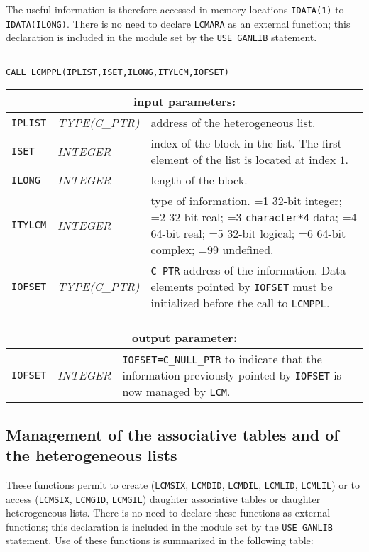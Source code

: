 The useful information is therefore accessed in memory locations {\tt IDATA(1)} to {\tt IDATA(ILONG)}. There is no need to 
declare {\tt LCMARA} as an external function; this declaration is included in the module set by the {\tt USE GANLIB} statement.
 
\begin{verbatim}

CALL LCMPPL(IPLIST,ISET,ILONG,ITYLCM,IOFSET)
\end{verbatim}

\noindent
\begin{tabular}{|p{1.5cm}|p{3cm}|p{10cm}|}
\hline
\multicolumn{3}{|c|}{\bf input parameters:} \\
\hline
{\tt IPLIST} & {\it TYPE(C\_PTR)} & address of the heterogeneous list. \\
\hline
{\tt ISET} & {\it INTEGER} & index of the block in the list.
The first element of the list is located at index $1$. \\
\hline
{\tt ILONG} & {\it INTEGER} & length of the block. \\
\hline
{\tt ITYLCM} & {\it INTEGER} & type of information. =1 32-bit integer; 
                                    =2 32-bit real; =3 {\tt character*4} data; 
				    =4 64-bit real; =5 32-bit logical; =6 64-bit complex;
				    =99 undefined. \\
\hline
{\tt IOFSET} &  {\it TYPE(C\_PTR)} & {\tt C\_PTR} address of the information. Data elements pointed
by {\tt IOFSET} must be initialized before the call to {\tt LCMPPL}. \\
\hline
\end{tabular}

\vskip 0.8cm

\noindent
\begin{tabular}{|p{1.5cm}|p{3cm}|p{10cm}|}
\hline
\multicolumn{3}{|c|}{\bf output parameter:} \\
\hline
{\tt IOFSET} & {\it INTEGER} & {\tt IOFSET=C\_NULL\_PTR} to indicate that the information previously pointed by
                                     {\tt IOFSET} is now managed by {\tt LCM}. \\
\hline
\end{tabular}

\subsection{Management of the associative tables and of the heterogeneous lists}

These functions permit to create ({\tt LCMSIX}, {\tt LCMDID}, {\tt LCMDIL},
{\tt LCMLID}, {\tt LCMLIL}) or to access ({\tt LCMSIX}, {\tt LCMGID}, {\tt LCMGIL})
daughter associative tables or daughter heterogeneous lists. There is no need to 
declare these functions as external functions; this declaration is included in the module set by the {\tt USE GANLIB} statement. Use of these functions is summarized in the following table:

